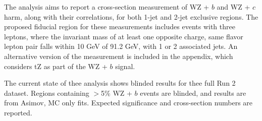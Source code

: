 The analysis aims to report a cross-section measurement of WZ + $b$ and WZ + $c$harm, along with their correlations, for both 1-jet and 2-jet exclusive regions. The proposed fiducial region for these measurements includes events with three leptons, where the invariant mass of at least one opposite charge, same flavor lepton pair falls within 10 GeV of 91.2 GeV, with 1 or 2 associated jets. An alternative version of the measurement is included in the appendix, which considers tZ as part of the WZ + $b$ signal.

The current state of thee analysis shows blinded results for thee full Run 2 dataset. Regions containing $>$5\% WZ + $b$ events are blinded, and results are from Asimov, MC only fits. Expected significance and cross-section numbers are reported.
